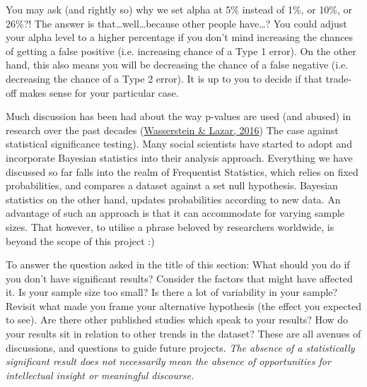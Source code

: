 \documentclass{article}
\begin{document}
You may ask (and rightly so) why we set alpha at 5\% instead of 1\%, or 10\%, or 26\%?! The answer is that…well…because other people have…? You could adjust your alpha level to a higher percentage if you don’t mind increasing the chances of getting a false positive (i.e. increasing chance of a Type 1 error). On the other hand, this also means you will be decreasing the chance of a false negative (i.e. decreasing the chance of a Type 2 error). It is up to you to decide if that trade-off makes sense for your particular case.

Much discussion has been had about the way p-values are used (and abused) in research over the past decades (\protect\hyperlink{wasserstein}{Wasserstein \& Lazar, 2016}) The case against statistical significance testing). Many social scientists have started to adopt and incorporate Bayesian statistics into their analysis approach. Everything we have discussed so far falls into the realm of Frequentist Statistics, which relies on fixed probabilities, and compares a dataset against a set null hypothesis. Bayesian statistics on the other hand, updates probabilities according to new data. An advantage of such an approach is that it can accommodate for varying sample sizes. That however, to utilise a phrase beloved by researchers worldwide, is beyond the scope of this project :)

To answer the question asked in the title of this section: What should you do if you don’t have significant results? Consider the factors that might have affected it. Is your sample size too small? Is there a lot of variability in your sample? Revisit what made you frame your alternative hypothesis (the effect you expected to see). Are there other published studies which speak to your results? How do your results sit in relation to other trends in the dataset? These are all avenues of discussions, and questions to guide future projects. \textit{The absence of a statistically significant result does not necessarily mean the absence of opportunities for intellectual insight or meaningful discourse.}
\end{document}
